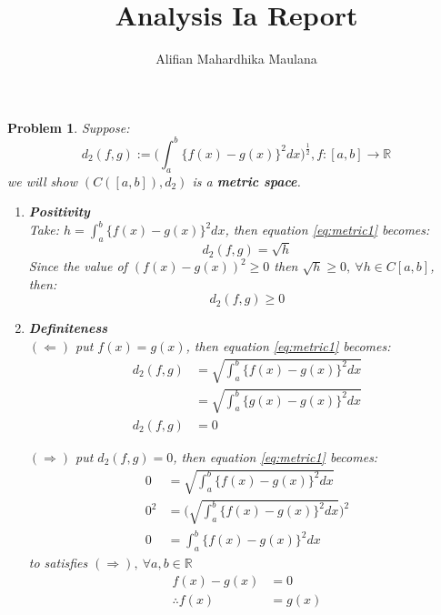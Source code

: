 \documentclass[a4paper,12pt]{article}
\title{Analysis Ia Report}
\author{Alifian Mahardhika Maulana}
\newtheorem{prob}{Problem}[]
\newcommand{\R}{\mathbb{R}}
\begin{document}
\maketitle
\begin{prob}
	Suppose:
	\begin{equation}\label{eq:metric1}
	d_2(f,g) := \bigg( \int_{a}^{b}\{f(x)-g(x)\}^2dx \bigg)^{\frac{1}{2}},f:[a,b]\rightarrow \R
	\end{equation}
	we will show $(C([a,b]),d_2)$ is a \textbf{metric space}.
	\begin{enumerate}[label=(\alph*)]
		\item \textbf{Positivity}\\
		Take: $h=\int_{a}^{b}\{f(x)-g(x)\}^2dx$, then equation \eqref{eq:metric1} becomes:
		\begin{equation*}
		d_2(f,g) = \sqrt{h}
		\end{equation*}
		Since the value of $(f(x)-g(x))^2\geq 0$ then $\sqrt{h}\geq 0,\ \forall h\in C[a,b]$, then:
		\begin{equation*}
		d_2(f,g) \geq 0
		\end{equation*}
		
		\item \textbf{Definiteness}\\
		$(\Leftarrow)$ put $f(x) = g(x)$, then equation \eqref{eq:metric1} becomes:
		\begin{equation*}
		\begin{aligned}
		d_2(f,g) &= \sqrt{\int_{a}^{b}\{f(x)-g(x)\}^2dx}\\
		&= \sqrt{\int_{a}^{b}\{g(x)-g(x)\}^2dx}\\
		d_2(f,g) &= 0
		\end{aligned}
		\end{equation*}
		
		$(\Rightarrow)$ put $d_2(f,g) = 0$, then equation \eqref{eq:metric1} becomes:
		\begin{equation*}
		\begin{aligned}
		0 &= \sqrt{\int_{a}^{b}\{f(x)-g(x)\}^2dx}\\
		0^2 &=\Bigg( \sqrt{\int_{a}^{b}\{f(x)-g(x)\}^2dx} \Bigg)^2\\
		0 &= \int_{a}^{b}\{f(x)-g(x)\}^2dx
		\end{aligned}
		\end{equation*}
		to satisfies $(\Rightarrow),\ \forall a,b \in \R$
		\begin{equation*}
		\begin{aligned}
		f(x) - g(x) &= 0\\
		\therefore f(x) &= g(x)
		\end{aligned}
		\end{equation*}
		

\end{enumerate}
\end{prob}
\end{document}

